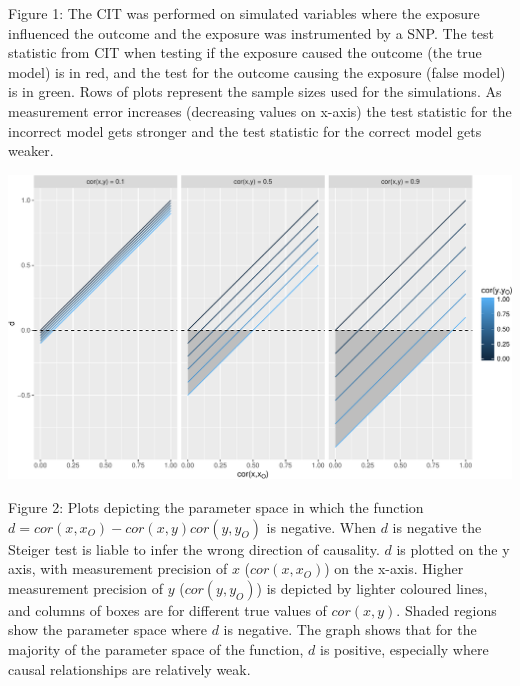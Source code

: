 \documentclass[]{article}
\begin{document}
Figure 1: The CIT was performed on simulated variables where the
exposure influenced the outcome and the exposure was instrumented by a
SNP. The test statistic from CIT when testing if the exposure caused the
outcome (the true model) is in red, and the test for the outcome causing
the exposure (false model) is in green. Rows of plots represent the
sample sizes used for the simulations. As measurement error increases
(decreasing values on x-axis) the test statistic for the incorrect model
gets stronger and the test statistic for the correct model gets weaker.

\newpage

\includegraphics{manuscript_files/figure-latex/d_relationship_figure-1.pdf}

Figure 2: Plots depicting the parameter space in which the function
\(d = cor(x, x_O) - cor(x,y)cor(y, y_O)\) is negative. When \(d\) is
negative the Steiger test is liable to infer the wrong direction of
causality. \(d\) is plotted on the y axis, with measurement precision of
\(x\) (\(cor(x,x_O)\)) on the x-axis. Higher measurement precision of
\(y\) (\(cor(y,y_O)\)) is depicted by lighter coloured lines, and
columns of boxes are for different true values of \(cor(x,y)\). Shaded
regions show the parameter space where \(d\) is negative. The graph
shows that for the majority of the parameter space of the function,
\(d\) is positive, especially where causal relationships are relatively
weak.

\newpage
\end{document}
